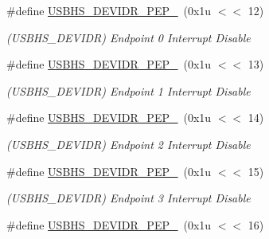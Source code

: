 \begin{DoxyCompactItemize}
\mbox{\label{group__SAMV71__USBHS_ga4d786bb6a453f549dee7c43ca99e73a1}} 
\#define \mbox{\hyperlink{group__SAMV71__USBHS_ga4d786bb6a453f549dee7c43ca99e73a1}{U\+S\+B\+H\+S\+\_\+\+D\+E\+V\+I\+D\+R\+\_\+\+P\+E\+P\+\_}}~(0x1u $<$$<$ 12)
\begin{DoxyCompactList}\small\item\em (U\+S\+B\+H\+S\+\_\+\+D\+E\+V\+I\+DR) Endpoint 0 Interrupt Disable \end{DoxyCompactList}\item 
\mbox{\label{group__SAMV71__USBHS_ga0d895e9bfbc5570ddca744f009cd5fc7}} 
\#define \mbox{\hyperlink{group__SAMV71__USBHS_ga0d895e9bfbc5570ddca744f009cd5fc7}{U\+S\+B\+H\+S\+\_\+\+D\+E\+V\+I\+D\+R\+\_\+\+P\+E\+P\+\_}}~(0x1u $<$$<$ 13)
\begin{DoxyCompactList}\small\item\em (U\+S\+B\+H\+S\+\_\+\+D\+E\+V\+I\+DR) Endpoint 1 Interrupt Disable \end{DoxyCompactList}\item 
\mbox{\label{group__SAMV71__USBHS_gade1490357edec0e625b63ce3394b84a5}} 
\#define \mbox{\hyperlink{group__SAMV71__USBHS_gade1490357edec0e625b63ce3394b84a5}{U\+S\+B\+H\+S\+\_\+\+D\+E\+V\+I\+D\+R\+\_\+\+P\+E\+P\+\_}}~(0x1u $<$$<$ 14)
\begin{DoxyCompactList}\small\item\em (U\+S\+B\+H\+S\+\_\+\+D\+E\+V\+I\+DR) Endpoint 2 Interrupt Disable \end{DoxyCompactList}\item 
\mbox{\label{group__SAMV71__USBHS_ga2a74174e1a0ef142393f6185ddd6154d}} 
\#define \mbox{\hyperlink{group__SAMV71__USBHS_ga2a74174e1a0ef142393f6185ddd6154d}{U\+S\+B\+H\+S\+\_\+\+D\+E\+V\+I\+D\+R\+\_\+\+P\+E\+P\+\_}}~(0x1u $<$$<$ 15)
\begin{DoxyCompactList}\small\item\em (U\+S\+B\+H\+S\+\_\+\+D\+E\+V\+I\+DR) Endpoint 3 Interrupt Disable \end{DoxyCompactList}\item 
\mbox{\label{group__SAMV71__USBHS_gac0c4d5faf32123d5991bcc666405b3ac}} 
\#define \mbox{\hyperlink{group__SAMV71__USBHS_gac0c4d5faf32123d5991bcc666405b3ac}{U\+S\+B\+H\+S\+\_\+\+D\+E\+V\+I\+D\+R\+\_\+\+P\+E\+P\+\_}}~(0x1u $<$$<$ 16)
$$
\end{DoxyCompactItemize}
